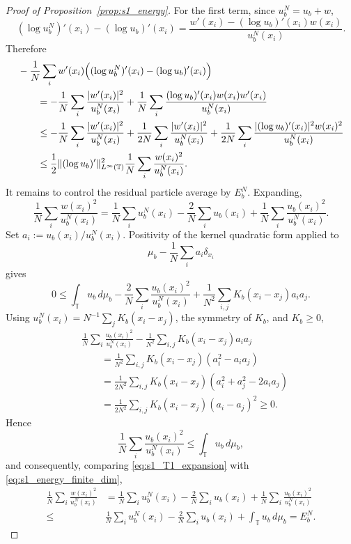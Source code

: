 \documentclass[11pt]{article}
\theoremstyle{definition}
\newcommand{\Torus}{\mathbb{T}}
\begin{document}
\begin{proof}[Proof of Proposition~\ref{prop:s1_energy}]
For the first term, since \(u^N_b=u_b+w\),
\[
(\log u^N_b)'(x_i)-(\log u_b)'(x_i)
=
\frac{w'(x_i)-(\log u_b)'(x_i)w(x_i)}{u^N_b(x_i)} .
\]
Therefore
\[
\begin{aligned}
&-\frac1N\sum_i
w'(x_i)\Bigl((\log u^N_b)'(x_i)-(\log u_b)'(x_i)\Bigr)
\\
&\qquad
=
-\frac1N\sum_i\frac{|w'(x_i)|^2}{u^N_b(x_i)}
+
\frac1N\sum_i
\frac{(\log u_b)'(x_i)w(x_i)w'(x_i)}{u^N_b(x_i)}
\\
&\qquad
\le
-\frac1N\sum_i\frac{|w'(x_i)|^2}{u^N_b(x_i)}
+
\frac1{2N}\sum_i\frac{|w'(x_i)|^2}{u^N_b(x_i)}
+
\frac1{2N}\sum_i
\frac{|(\log u_b)'(x_i)|^2w(x_i)^2}{u^N_b(x_i)}
\\
&\qquad
\le
\frac12\|(\log u_b)'\|_{L^\infty(\Torus)}^2
\frac1N\sum_i\frac{w(x_i)^2}{u^N_b(x_i)} .
\end{aligned}
\]
It remains to control the residual particle average by \(E^N_b\). Expanding,
\begin{equation}
\label{eq:s1_T1_expansion}
\frac1N\sum_i\frac{w(x_i)^2}{u^N_b(x_i)}
=
\frac1N\sum_i u^N_b(x_i)
-\frac2N\sum_i u_b(x_i)
+
\frac1N\sum_i\frac{u_b(x_i)^2}{u^N_b(x_i)} .
\end{equation}
Set \(a_i:=u_b(x_i)/u^N_b(x_i)\). Positivity of the kernel quadratic form
applied to
\[
\mu_b-\frac1N\sum_i a_i\delta_{x_i}
\]
gives
\[
0
\le
\int_{\Torus}u_b\,d\mu_b
-\frac2N\sum_i\frac{u_b(x_i)^2}{u^N_b(x_i)}
+
\frac1{N^2}\sum_{i,j}K_b(x_i-x_j)a_i a_j .
\]
Using \(u^N_b(x_i)=N^{-1}\sum_jK_b(x_i-x_j)\), the symmetry of \(K_b\), and \(K_b\ge0\),
\[
\begin{aligned}
&\frac1N\sum_i\frac{u_b(x_i)^2}{u^N_b(x_i)}
-
\frac1{N^2}\sum_{i,j}K_b(x_i-x_j)a_i a_j
\\
&\qquad =
\frac1{N^2}\sum_{i,j}K_b(x_i-x_j)(a_i^2-a_i a_j)
\\
&\qquad =
\frac1{2N^2}\sum_{i,j}K_b(x_i-x_j)(a_i^2+a_j^2-2a_i a_j)
\\
&\qquad =
\frac1{2N^2}\sum_{i,j}K_b(x_i-x_j)(a_i-a_j)^2
\ge0 .
\end{aligned}
\]
Hence
\[
\frac1N\sum_i\frac{u_b(x_i)^2}{u^N_b(x_i)}
\le
\int_{\Torus}u_b\,d\mu_b ,
\]
and consequently, comparing \eqref{eq:s1_T1_expansion} with \eqref{eq:s1_energy_finite_dim},
\begin{align*}
\frac1N\sum_i\frac{w(x_i)^2}{u^N_b(x_i)}
&=
\frac1N\sum_i u^N_b(x_i)
-\frac2N\sum_i u_b(x_i)
+
\frac1N\sum_i\frac{u_b(x_i)^2}{u^N_b(x_i)} \\
\le & \frac1N\sum_i u^N_b(x_i)
-\frac2N\sum_i u_b(x_i)
+
\int_{\Torus}u_b\,d\mu_b = 
E^N_b .
\end{align*}

\end{proof}
\end{document}
